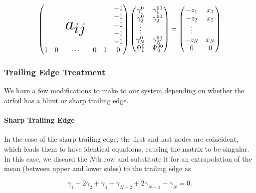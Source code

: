 \documentclass[]{article}
\begin{document}
 \begin{equation}
	\begin{pmatrix}
		& & & & & -1 \\
		& & \multirow{3}{*}{\Huge $a_{ij}$}  & & & -1 \\
		& & & & & -1 \\
		& & & & & -1 \\
		& & & & & -1 \\
		1 & 0 & \cdots & 0 & 1 & 0
	\end{pmatrix}
%
	\begin{pmatrix}
		\gamma^0_1 & \gamma^{90}_1 \\
		\gamma^0_2 & \gamma^{90}_2 \\
		\vdots \\
		\gamma^0_N & \gamma^{90}_N \\
		\Psi^0_0 & \Psi^{90}_0\\
	\end{pmatrix}
=
	\begin{pmatrix}
		-z_1 & x_1 \\
		-z_2 & x_2 \\
		\vdots \\
		-z_N & x_N \\
		0 & 0
	\end{pmatrix}
\end{equation}


\subsubsection{Trailing Edge Treatment}

We have a few modifications to make to our system depending on whether the airfoil has a blunt or sharp trailing edge.

\paragraph{Sharp Trailing Edge}

In the case of the sharp trailing edge, the first and last nodes are coincident, which leads them to have identical equations, causing the matrix to be singular.  In this case, we discard the \(N\)th row and substitute it for an extrapolation of the mean (between upper and lower sides) to the trailing edge as

\begin{equation}
	\gamma_1 - 2\gamma_2 + \gamma_3 - \gamma_{N-2} + 2\gamma_{N-1} - \gamma_N = 0.
\end{equation}
\end{document}
